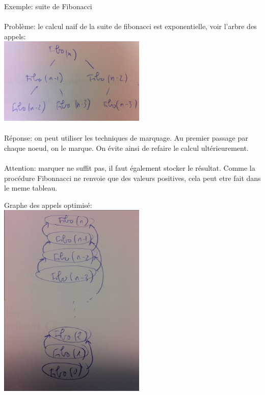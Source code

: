 \begin{exercice}{Exemple: suite de Fibonacci}

\paragraph{}
Problème: le calcul naif de la suite de fibonacci est exponentielle, voir l'arbre des appels:\\
\includegraphics[width=7cm]{fibo_expo}

\paragraph{}
Réponse: on peut utiliser les techniques de marquage. Au premier passage par chaque noeud, on le marque. On évite ainsi de refaire le calcul ultérieurement.

\paragraph{}
Attention: marquer ne suffit pas, il faut également stocker le résultat. Comme la procédure Fibonnacci ne renvoie que des valeurs positives, cela peut etre fait dans le meme tableau.

Graphe des appels optimisé:\\
\includegraphics[width=7cm]{fibo_graph}


\end{exercice}
